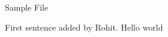 \documentclass{article}
\begin{document}
\centerline{\sc \large Sample File}
\vspace{.5pc}
\centerline{\sc }
\vspace{2pc}

First sentence added by Rohit.
Hello world
\end{document}
